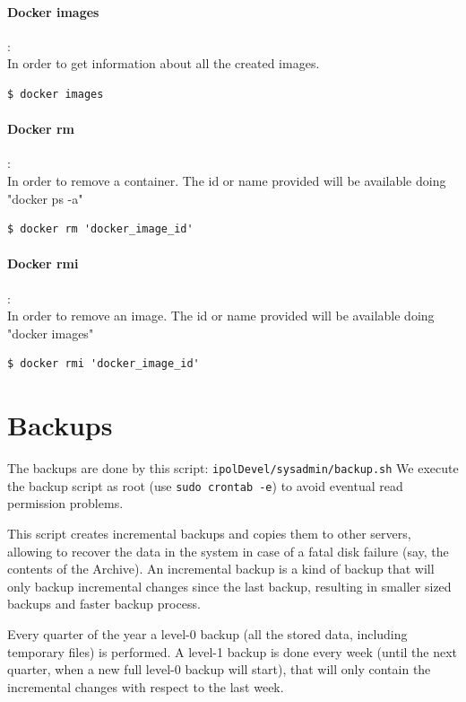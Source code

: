 \documentclass[a4paper,12pt]{article}
\begin{document}
\paragraph{Docker images}:\\
In order to get information about all the created images.
\begin{lstlisting}[firstnumber=1,breaklines]
  $ docker images
\end{lstlisting}

\paragraph{Docker rm}:\\
In order to remove a container. The id or name provided will be available doing "docker ps -a"
\begin{lstlisting}[firstnumber=1,breaklines]
  $ docker rm 'docker_image_id'
\end{lstlisting}

\paragraph{Docker rmi}:\\
In order to remove an image. The id or name provided will be available doing "docker images"
\begin{lstlisting}[firstnumber=1,breaklines]
  $ docker rmi 'docker_image_id'
\end{lstlisting}



\section{Backups}
\label{sec:backups}
The backups are done by this script: {\tt ipolDevel/sysadmin/backup.sh}
We execute the backup script as root (use {\tt sudo crontab -e}) to avoid eventual read permission problems.

This script creates incremental backups and copies them to other servers, allowing to recover the data in the system in case of a fatal disk failure (say, the contents of the Archive). An incremental backup is a kind of backup that will only backup incremental changes since the last backup, resulting in smaller sized backups and faster backup process.

Every quarter of the year a level-0 backup (all the stored data, including temporary files) is performed. A level-1 backup is done every week (until the next quarter, when a new full level-0 backup will start), that will only contain the incremental changes with respect to the last week.
\end{document}
